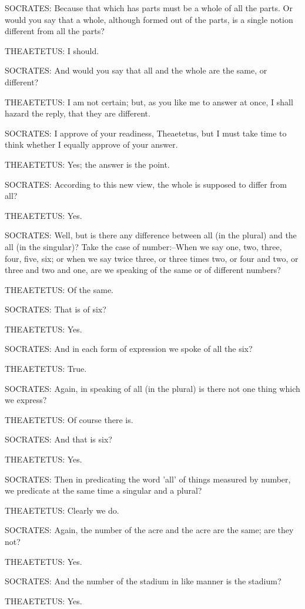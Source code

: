 SOCRATES: Because that which has parts must be a whole of all the parts.
Or would you say that a whole, although formed out of the parts, is a
single notion different from all the parts?

THEAETETUS: I should.

SOCRATES: And would you say that all and the whole are the same, or
different?

THEAETETUS: I am not certain; but, as you like me to answer at once, I
shall hazard the reply, that they are different.

SOCRATES: I approve of your readiness, Theaetetus, but I must take time
to think whether I equally approve of your answer.

THEAETETUS: Yes; the answer is the point.

SOCRATES: According to this new view, the whole is supposed to differ
from all?

THEAETETUS: Yes.

SOCRATES: Well, but is there any difference between all (in the plural)
and the all (in the singular)? Take the case of number:--When we say
one, two, three, four, five, six; or when we say twice three, or three
times two, or four and two, or three and two and one, are we speaking of
the same or of different numbers?

THEAETETUS: Of the same.

SOCRATES: That is of six?

THEAETETUS: Yes.

SOCRATES: And in each form of expression we spoke of all the six?

THEAETETUS: True.

SOCRATES: Again, in speaking of all (in the plural) is there not one
thing which we express?

THEAETETUS: Of course there is.

SOCRATES: And that is six?

THEAETETUS: Yes.

SOCRATES: Then in predicating the word 'all' of things measured by
number, we predicate at the same time a singular and a plural?

THEAETETUS: Clearly we do.

SOCRATES: Again, the number of the acre and the acre are the same; are
they not?

THEAETETUS: Yes.

SOCRATES: And the number of the stadium in like manner is the stadium?

THEAETETUS: Yes.

